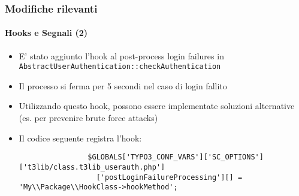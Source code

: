 \begin{frame}[fragile]
	\frametitle{Modifiche rilevanti}
	\framesubtitle{Hooks e Segnali (2)}

	\lstset{basicstyle=\tiny\ttfamily}

	\begin{itemize}

		\item E' stato aggiunto l'hook al post-process login failures in \texttt{AbstractUserAuthentication::checkAuthentication}

		\item Il processo si ferma per 5 secondi nel caso di login fallito

		\item Utilizzando questo hook, possono essere implementate soluzioni alternative
			(es. per prevenire brute force attacks)

		\item Il codice seguente registra l'hook:

			\begin{lstlisting}
				$GLOBALS['TYPO3_CONF_VARS']['SC_OPTIONS']['t3lib/class.t3lib_userauth.php']
				  ['postLoginFailureProcessing'][] = 'My\\Package\\HookClass->hookMethod';
			\end{lstlisting}

	\end{itemize}

\end{frame}


